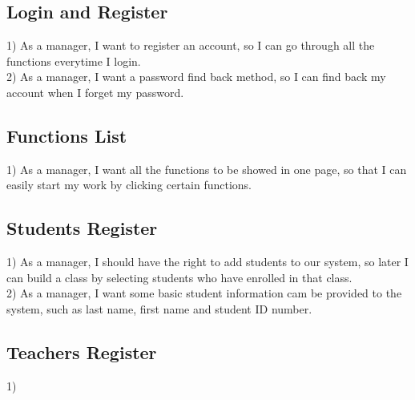 \subsection{Login and Register}
1) As a manager, I want to register an account, so I can go through all the functions everytime I login.\\2) As a manager, I want a password find back method, so I can find back my account when I forget my password.

\subsection{Functions List}
1) As a manager, I want all the functions to be showed in one page, so that I can easily start my work by clicking certain functions.

\subsection{Students Register}
1) As a manager, I should have the right to add students to our system, so later I can build a class by selecting students who have enrolled in that class.\\
2) As a manager, I want some basic student information cam be provided to the system, such as last name, first name and student ID number.

\subsection{Teachers Register}
1) 